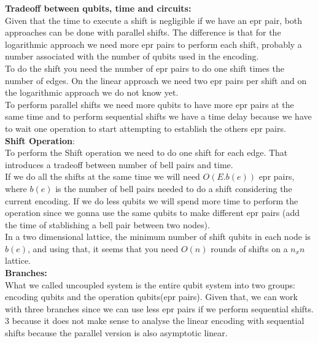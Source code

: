 \documentclass{article}
\begin{document}
    \textbf{Tradeoff between qubits, time and circuits:}\\ 

        Given that the time to execute a shift is negligible if we have an epr pair, both approaches can be done with parallel shifts. The difference is that for the logarithmic approach we need more epr pairs to perform each shift, probably a number associated with the number of qubits used in the encoding. \\

        To do the shift you need the number of epr pairs to do one shift times the number of edges. On the linear approach we need two epr pairs per shift and on the logarithmic approach we do not know yet.\\

        To perform parallel shifts we need more qubits to have more epr pairs at the same time and to perform sequential shifts we have a time delay because we have to wait one operation to start attempting to establish the others epr pairs.\\

    \textbf{Shift Operation}:\\

        To perform the Shift operation we need to do one shift for each edge. That introduces a tradeoff between number of bell pairs and time.\\

        If we do all the shifts at the same time we will need $O(E.b(e))$ epr pairs, where $b(e)$ is the number of bell pairs needed to do a shift considering the current encoding. If we do less qubits we will spend more time to perform the operation since we gonna use the same qubits to make different epr pairs (add the time of stablishing a bell pair between two nodes).\\

        In a two dimensional lattice, the minimum number of shift qubits in each node is $b(e)$, and using that, it seems that you need $O(n)$ rounds of shifts on a $n_xn$ lattice.\\

    \textbf{Branches:}\\

        What we called uncoupled system is the entire qubit system into two groups: encoding qubits and the operation qubits(epr pairs). Given that, we can work with three branches since we can use less epr pairs if we perform sequential shifts. 3 because it does not make sense to analyse the linear encoding with sequential shifts because the parallel version is also asymptotic linear.
    
\end{document}
